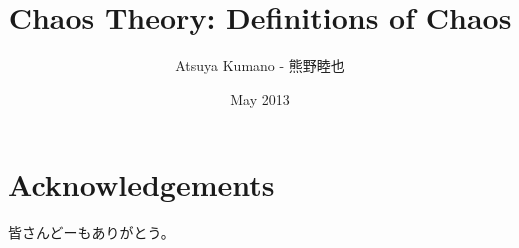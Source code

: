\documentclass[12pt,twoside]{reedthesis}
\title{Chaos Theory: Definitions of Chaos}
\author{Atsuya Kumano - 熊野睦也}
\date{May 2013}
\begin{document}
\maketitle
\frontmatter %
\pagestyle{empty} %

\chapter*{Acknowledgements}
皆さんどーもありがとう。

\tableofcontents


\mainmatter %
\pagestyle{fancyplain} %




















\end{document}
